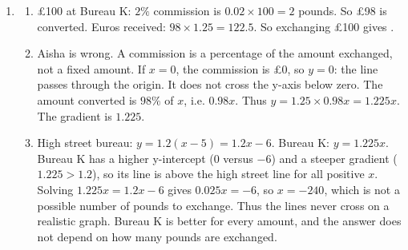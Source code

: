 \documentclass[12pt,a4paper]{article}
\begin{document}
\begin{enumerate}[label=\textbf{Q\arabic*.}, leftmargin=*]
\item
\begin{enumerate}
\item \pounds100 at Bureau K: \(2\%\) commission is \(0.02\times100=2\) pounds. So \pounds98 is converted. Euros received: \(98\times1.25=122.5\). So exchanging \pounds100 gives .
\item Aisha is wrong. A commission is a percentage of the amount exchanged, not a fixed amount. If \(x=0\), the commission is \pounds0, so \(y=0\): the line passes through the origin. It does not cross the y-axis below zero. The amount converted is \(98\%\) of \(x\), i.e. \(0.98x\). Thus \(y=1.25\times0.98x=1.225x\). The gradient is \(1.225\).
\item High street bureau: \(y=1.2(x-5)=1.2x-6\). Bureau K: \(y=1.225x\). Bureau K has a higher y-intercept (\(0\) versus \(-6\)) and a steeper gradient (\(1.225>1.2\)), so its line is above the high street line for all positive \(x\). Solving \(1.225x=1.2x-6\) gives \(0.025x=-6\), so \(x=-240\), which is not a possible number of pounds to exchange. Thus the lines never cross on a realistic graph. Bureau K is better for every amount, and the answer does not depend on how many pounds are exchanged.
\end{enumerate}
\end{enumerate}
\end{document}
